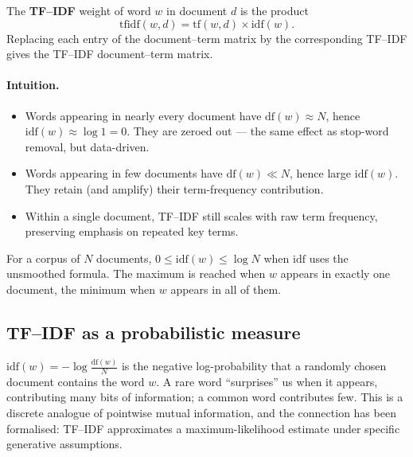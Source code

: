 \begin{definition}[TF--IDF]
The \textbf{TF--IDF} weight of word $w$ in document $d$ is the product
\[ \mathrm{tfidf}(w, d) = \mathrm{tf}(w, d) \times \mathrm{idf}(w). \]
Replacing each entry of the document--term matrix by the corresponding TF--IDF gives the TF--IDF document--term matrix.
\end{definition}

\paragraph{Intuition.}
\begin{itemize}
    \item Words appearing in nearly every document have $\mathrm{df}(w) \approx N$, hence $\mathrm{idf}(w) \approx \log 1 = 0$. They are zeroed out --- the same effect as stop-word removal, but data-driven.
    \item Words appearing in few documents have $\mathrm{df}(w) \ll N$, hence large $\mathrm{idf}(w)$. They retain (and amplify) their term-frequency contribution.
    \item Within a single document, TF--IDF still scales with raw term frequency, preserving emphasis on repeated key terms.
\end{itemize}

\begin{property}
For a corpus of $N$ documents, $0 \le \mathrm{idf}(w) \le \log N$ when $\mathrm{idf}$ uses the unsmoothed formula. The maximum is reached when $w$ appears in exactly one document, the minimum when $w$ appears in all of them.
\end{property}

\subsection{TF--IDF as a probabilistic measure}

\begin{remark}
$\mathrm{idf}(w) = -\log \frac{\mathrm{df}(w)}{N}$ is the negative log-probability that a randomly chosen document contains the word $w$. A rare word ``surprises'' us when it appears, contributing many bits of information; a common word contributes few. This is a discrete analogue of pointwise mutual information, and the connection has been formalised: TF--IDF approximates a maximum-likelihood estimate under specific generative assumptions.
\end{remark}

